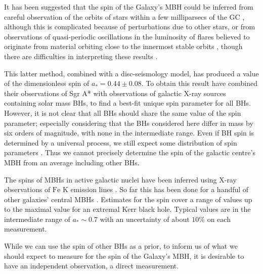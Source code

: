 \documentclass[useAMS,usedcolumn,usegraphicx,usenatbib]{mn2e}
\begin{document}
It has been suggested that the spin of the Galaxy's MBH could be inferred from careful observation of the orbits of stars within a few milliparsecs of the GC \citep{Merritt2010}, although this is complicated because of perturbations due to other stars, or from observations of quasi-periodic oscillations in the luminosity of flares believed to originate from material orbiting close to the innermost stable orbits \citep{Genzel2003a, Belanger2006, Trippe2007, Hamaus2009, Kato2010}, though there are difficulties in interpreting these results \citep{Psaltis2008a}.

This latter method, combined with a disc-seismology model, has produced a value of the dimensionless spin of $a_\ast = 0.44 \pm 0.08$. To obtain this result \citet{Kato2010} have combined their observations of Sgr A* with observations of galactic X-ray sources containing solar mass BHs, to find a best-fit unique spin parameter for all BHs. However, it is not clear that all BHs should share the same value of the spin parameter; especially considering that the BHs considered here differ in mass by six orders of magnitude, with none in the intermediate range. Even if BH spin is determined by a universal process, we still expect some distribution of spin parameters \citep{King2008, Berti2008}. Thus we cannot precisely determine the spin of the galactic centre's MBH from an average including other BHs.

The spins of MBHs in active galactic nuclei have been inferred using X-ray observations of $\mathrm{Fe}$ $\mathrm{K}$ emission lines \citep{Miller2007, McClintock2011}. So far this has been done for a handful of other galaxies' central MBHs \citep{Brenneman2006, Miniutti2009, Schmoll2009, delaCallePerez2010, Zoghbi2010, Nardini2011,  Patrick2011}. Estimates for the spin cover a range of values up to the maximal value for an extremal Kerr black hole. Typical values are in the intermediate range of $a_\ast \sim 0.7$ with an uncertainty of about $10\%$ on each measurement.

While we can use the spin of other BHs as a prior, to inform us of what we should expect to measure for the spin of the Galaxy's MBH, it is desirable to have an independent observation, a direct measurement.
\end{document}
